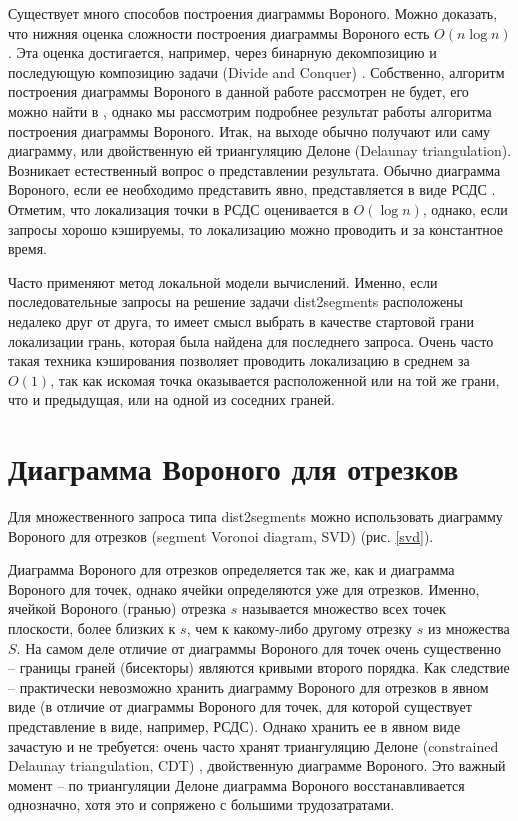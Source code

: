 Существует много способов построения диаграммы Вороного. Можно
доказать, что нижняя оценка сложности построения диаграммы Вороного есть
$O(n \log n)$. Эта оценка достигается, например, через бинарную декомпозицию и
последующую композицию задачи (Divide and Conquer) \cite{PrSh}. Собственно, алгоритм
построения диаграммы Вороного в данной работе рассмотрен не будет, его
можно найти в \cite{PrSh, CGAL}, однако мы рассмотрим подробнее результат работы
алгоритма построения диаграммы Вороного. Итак, на выходе обычно получают
или саму диаграмму, или двойственную ей триангуляцию Делоне (Delaunay
triangulation). Возникает естественный вопрос о представлении результата.
Обычно диаграмма Вороного, если ее необходимо представить явно,
представляется в виде РСДС \cite{PrSh}. Отметим, что локализация точки в РСДС
оценивается в $O(\log n)$, однако, если запросы хорошо кэшируемы, то
локализацию можно проводить и за константное время.

Часто применяют метод локальной модели вычислений. Именно, если
последовательные запросы на решение задачи dist2segments расположены недалеко
друг от друга, то имеет смысл выбрать в качестве стартовой грани локализации
грань, которая была найдена для последнего запроса. Очень часто такая
техника кэширования позволяет проводить локализацию в среднем за $O(1)$, так как
искомая точка оказывается расположенной или на той же грани, что и
предыдущая, или на одной из соседних граней.

\FloatBarrier
\section{Диаграмма Вороного для отрезков}

Для множественного запроса типа dist2segments можно использовать
диаграмму Вороного для отрезков (segment Voronoi diagram, SVD) \cite{SVD} (рис. \ref{svd}).


Диаграмма Вороного для отрезков определяется так же, как и диаграмма
Вороного для точек, однако ячейки определяются уже для отрезков. Именно,
ячейкой Вороного (гранью) отрезка $s$ называется множество всех точек
плоскости, более близких к $s$, чем к какому-либо другому отрезку $s$ из
множества $S$. На самом деле отличие от диаграммы Вороного для точек очень
существенно -- границы граней (бисекторы) являются кривыми второго
порядка. Как следствие -- практически невозможно хранить диаграмму Вороного
для отрезков в явном виде (в отличие от диаграммы Вороного для точек, для которой существует
представление в виде, например, РСДС).
Однако хранить ее в явном виде зачастую и не требуется: очень часто
хранят триангуляцию Делоне (constrained Delaunay
triangulation, CDT) \cite{CGAL}, двойственную диаграмме Вороного. Это важный момент -- 
по триангуляции Делоне диаграмма Вороного восстанавливается
однозначно, хотя это и сопряжено с большими трудозатратами.

